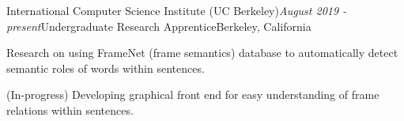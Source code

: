 \begin{rSubsection}{International Computer Science Institute (UC Berkeley)}{\em August 2019 - present}{Undergraduate Research Apprentice}{Berkeley, California}
\item Research on using FrameNet (frame semantics) database to automatically detect semantic roles of words within sentences.
\item (In-progress) Developing graphical front end for easy understanding of frame relations within sentences.
\end{rSubsection}